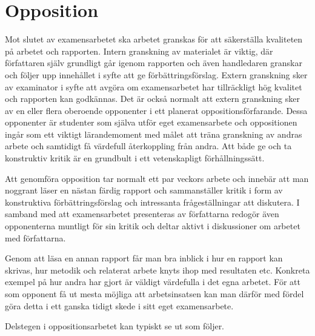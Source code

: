 \section{Opposition}\label{opposition}

Mot slutet av examensarbetet ska arbetet granskas för att säkerställa
kvaliteten på arbetet och rapporten. Intern granskning av materialet är
viktig, där författaren själv grundligt går igenom rapporten och även
handledaren granskar och följer upp innehållet i syfte att ge
förbättringsförslag. Extern granskning sker av examinator i syfte att
avgöra om examensarbetet har tillräckligt hög kvalitet och rapporten kan
godkännas. Det är också normalt att extern granskning sker av en eller
flera oberoende opponenter i ett planerat oppositionsförfarande. Dessa
opponenter är studenter som själva utför eget examensarbete och
oppositionen ingår som ett viktigt lärandemoment med målet att träna
granskning av andras arbete och samtidigt få värdefull återkoppling från
andra. Att både ge och ta konstruktiv kritik är en grundbult i ett
vetenskapligt förhållningssätt.

Att genomföra opposition tar normalt ett par veckors arbete och innebär
att man noggrant läser en nästan färdig rapport och sammanställer kritik
i form av konstruktiva förbättringsförslag och intressanta
frågeställningar att diskutera. I samband med att examensarbetet
presenteras av författarna redogör även opponenterna muntligt för sin
kritik och deltar aktivt i diskussioner om arbetet med författarna.

Genom att läsa en annan rapport får man bra inblick i hur en rapport kan
skrivas, hur metodik och relaterat arbete knyts ihop med resultaten etc.
Konkreta exempel på hur andra har gjort är väldigt värdefulla i det egna
arbetet. För att som opponent få ut mesta möjliga att arbetsinsatsen kan
man därför med fördel göra detta i ett ganska tidigt skede i sitt eget
examensarbete.

Delstegen i oppositionsarbetet kan typiskt se ut som följer.

